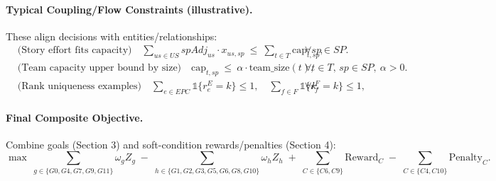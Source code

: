 \documentclass[11pt,a4paper]{article}
\begin{document}
\paragraph{Typical Coupling/Flow Constraints (illustrative).}
These align decisions with entities/relationships:
\begin{align*}
&\text{(Story effort fits capacity)}\quad
\sum_{us \in US} spAdj_{us} \cdot x_{us,sp} \ \le \ \sum_{t \in T} \text{cap}_{t,sp}, && \forall sp \in SP.\\[4pt]
&\text{(Team capacity upper bound by size)}\quad
\text{cap}_{t,sp} \ \le \ \alpha \cdot \text{team\_size}(t), && \forall t \in T,\, sp \in SP,\ \alpha>0.\\[4pt]
&\text{(Rank uniqueness examples)}\quad
\sum_{e \in EPC} \mathbb{1}\{r^E_e = k\} \le 1,\quad
\sum_{f \in F} \mathbb{1}\{r^F_f = k\} \le 1, && \forall k.
\end{align*}

\paragraph{Final Composite Objective.}
Combine goals (Section 3) and soft-condition rewards/penalties (Section 4):
\[
\max\ \sum_{g \in \{G0,G4,G7,G9,G11\}} \omega_g Z_g
\;-\; \sum_{h \in \{G1,G2,G3,G5,G6,G8,G10\}} \omega_h Z_h
\;+\; \sum_{C \in \{C6,C9\}} \text{Reward}_C
\;-\; \sum_{C \in \{C4,C10\}} \text{Penalty}_C.
\]
\end{document}
